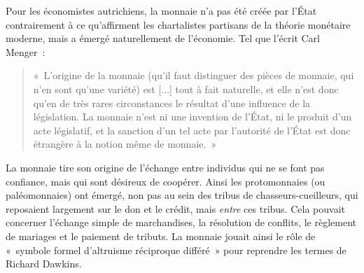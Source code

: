 
Pour les économistes autrichiens, la monnaie n'a pas été créée par l'État contrairement à ce qu'affirment les chartalistes partisans de la théorie monétaire moderne, mais a émergé naturellement de l'économie. Tel que l'écrit Carl Menger~:

\begin{quote}
«~L'origine de la monnaie (qu'il faut distinguer des pièces de monnaie, qui n'en sont qu'une variété) est [...] tout à fait naturelle, et elle n'est donc qu'en de très rares circonstances le résultat d'une influence de la législation. La monnaie n'est ni une invention de l'État, ni le produit d'un acte législatif, et la sanction d'un tel acte par l'autorité de l'État est donc étrangère à la notion même de monnaie.~»
\end{quote} %

La monnaie tire son origine de l'échange entre individus qui ne se font pas confiance, mais qui sont désireux de coopérer. Ainsi les protomonnaies (ou paléomonnaies) ont émergé, non pas au sein des tribus de chasseurs-cueilleurs, qui reposaient largement sur le don et le crédit, mais \emph{entre} ces tribus. Cela pouvait concerner l'échange simple de marchandises, la résolution de conflits, le règlement de mariages et le paiement de tributs. La monnaie jouait ainsi le rôle de «~symbole formel d'altruisme réciproque différé~» pour reprendre les termes de Richard Dawkins.

